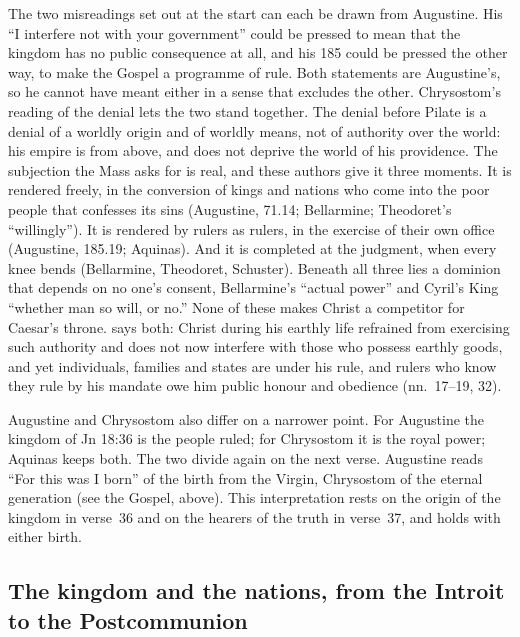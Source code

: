 The two misreadings set out at the start can each be drawn from Augustine.
His ``I interfere not with your government'' could be pressed to mean that the
kingdom has no public consequence at all, and his  185 could be
pressed the other way, to make the Gospel a programme of rule. Both statements
are Augustine's, so he cannot have meant either in a sense that excludes the
other.
Chrysostom's reading of the denial lets the two stand together. The denial
before Pilate is a denial of a worldly origin and of worldly means, not of
authority over the world: his empire is from above, and does not deprive the
world of his providence. The subjection the Mass asks for is real, and these
authors give it three moments. It is rendered freely, in the conversion of kings and nations who
come into the poor people that confesses its sins (Augustine,  71.14; Bellarmine; Theodoret's ``willingly''). It is rendered by
rulers as rulers, in the exercise of their own office (Augustine, 
185.19; Aquinas). And it is completed at the judgment, when every knee bends
(Bellarmine, Theodoret, Schuster). Beneath all three lies a dominion that
depends on no one's consent, Bellarmine's ``actual power'' and Cyril's King
``whether man so will, or no.'' None of these makes Christ a competitor for
Caesar's throne.  says both: Christ during his earthly life refrained from exercising such authority and does not
now interfere with those who possess earthly goods, and yet individuals,
families and states are under his rule, and rulers who know they rule by his
mandate owe him public honour and obedience (nn.~17--19, 32).

Augustine and Chrysostom also differ on a narrower point. For Augustine the
kingdom of Jn 18:36 is the people ruled; for Chrysostom it is the royal power;
Aquinas keeps both. The two divide again on the next verse. Augustine reads
``For this was I born'' of the birth from the Virgin, Chrysostom of the eternal
generation (see the Gospel, above). This interpretation rests on the origin of
the kingdom in verse~36 and on the hearers of the truth in verse~37, and holds
with either birth.

\subsection{The kingdom and the nations, from the Introit to the Postcommunion}
\label{sec:hence-elements}

